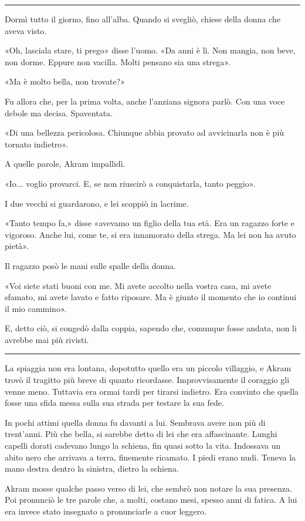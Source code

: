 \documentclass[a4paper,11pt,oneside,openright,final]{memoir}
\begin{document}
\plainbreak{1}

Dormì tutto il giorno, fino all'alba. Quando si svegliò, chiese della donna
che aveva visto.

«Oh, lasciala stare, ti prego» disse l'uomo. «Da anni è lì. Non mangia, non
beve, non dorme. Eppure non vacilla. Molti pensano sia una strega».

«Ma è molto bella, non trovate?»

Fu allora che, per la prima volta, anche l'anziana signora parlò. Con una voce
debole ma decisa. Spaventata.

«Di una bellezza pericolosa. Chiunque abbia provato ad avvicinarla non è più
tornato indietro».

A quelle parole, Akram impallidì.

«Io... voglio provarci. E, se non riuscirò a conquistarla, tanto peggio».

I due vecchi si guardarono, e lei scoppiò in lacrime.

«Tanto tempo fa,» disse «avevamo un figlio della tua età. Era un ragazzo
forte e vigoroso. Anche lui, come te, si era innamorato della strega. Ma lei non
ha avuto pietà».

Il ragazzo posò le mani sulle spalle della donna.

«Voi siete stati buoni con me. Mi avete accolto nella vostra casa, mi avete
sfamato, mi avete lavato e fatto riposare. Ma è giunto il momento che io
continui il mio cammino».

E, detto ciò, si congedò dalla coppia, sapendo che, comunque fosse andata, non
li avrebbe mai più rivisti.

\plainbreak{1}

La spiaggia non era lontana, dopotutto quello era un piccolo villaggio, e Akram
trovò il tragitto più breve di quanto ricordasse. Improvvisamente il coraggio
gli venne meno. Tuttavia era ormai tardi per tirarsi indietro. Era convinto che
quella fosse una sfida messa sulla sua strada per testare la sua fede.

In pochi attimi quella donna fu davanti a lui. Sembrava avere non più di
trent'anni. Più che bella, si sarebbe detto di lei che era affascinante. Lunghi
capelli dorati cadevano lungo la schiena, fin quasi sotto la vita. Indossava un
abito nero che arrivava a terra, finemente ricamato. I piedi erano nudi. Teneva
la mano destra dentro la sinistra, dietro la schiena.

Akram mosse qualche passo verso di lei, che sembrò non notare la sua presenza.
Poi pronunciò le tre parole che, a molti, costano mesi, spesso anni di fatica.
A lui era invece stato insegnato a pronunciarle a cuor leggero.
\end{document}
